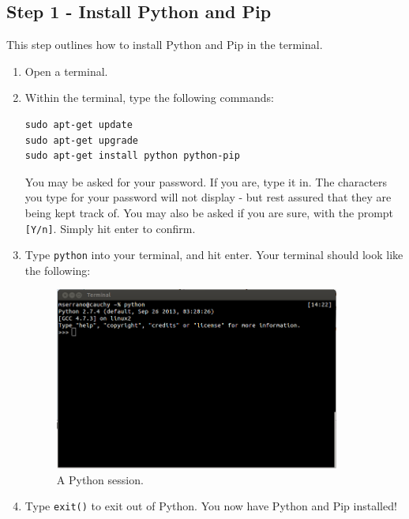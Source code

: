 \documentclass{article}
\begin{document}
\subsection{Step 1 - Install Python and Pip}
This step outlines how to install Python and Pip in the terminal.
\begin{enumerate}
\item Open a terminal.
\item Within the terminal, type the following commands:
\begin{verbatim}
sudo apt-get update
sudo apt-get upgrade
sudo apt-get install python python-pip
\end{verbatim}
You may be asked for your password. If you are, type it in. The characters you type for your password
will not display - but rest assured that they are being kept track of. You may 
also be asked if you are sure, with the prompt \verb+[Y/n]+. Simply hit enter
to confirm.
\item Type \verb+python+ into your terminal, and hit enter. Your terminal should look like
the following:


\begin{figure}[h!]
\centering \includegraphics[height=6cm]{pic1.png} \caption{A Python session.}
\end{figure}

\item Type \verb+exit()+ to exit out of Python. You now have Python and Pip installed!
\end{enumerate}
\end{document}
